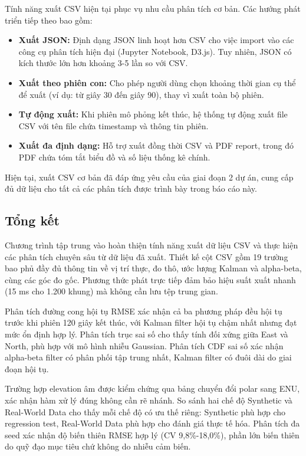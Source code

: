 \hspace{0.5cm} Tính năng xuất CSV hiện tại phục vụ nhu cầu phân tích cơ bản. Các hướng phát triển tiếp theo bao gồm:

\begin{itemize}
\item \textbf{Xuất JSON:} Định dạng JSON linh hoạt hơn CSV cho việc import vào các công cụ phân tích hiện đại (Jupyter Notebook, D3.js). Tuy nhiên, JSON có kích thước lớn hơn khoảng 3-5 lần so với CSV.
\item \textbf{Xuất theo phiên con:} Cho phép người dùng chọn khoảng thời gian cụ thể để xuất (ví dụ: từ giây 30 đến giây 90), thay vì xuất toàn bộ phiên.
\item \textbf{Tự động xuất:} Khi phiên mô phỏng kết thúc, hệ thống tự động xuất file CSV với tên file chứa timestamp và thông tin phiên.
\item \textbf{Xuất đa định dạng:} Hỗ trợ xuất đồng thời CSV và PDF report, trong đó PDF chứa tóm tắt biểu đồ và số liệu thống kê chính.
\end{itemize}

Hiện tại, xuất CSV cơ bản đã đáp ứng yêu cầu của giai đoạn 2 dự án, cung cấp đủ dữ liệu cho tất cả các phân tích được trình bày trong báo cáo này.

\subsection{Tổng kết}

\hspace{0.5cm} Chương trình tập trung vào hoàn thiện tính năng xuất dữ liệu CSV và thực hiện các phân tích chuyên sâu từ dữ liệu đã xuất. Thiết kế cột CSV gồm 19 trường bao phủ đầy đủ thông tin về vị trí thực, đo thô, ước lượng Kalman và alpha-beta, cùng các góc đo gốc. Phương thức phát trực tiếp đảm bảo hiệu suất xuất nhanh (15 ms cho 1.200 khung) mà không cần lưu tệp trung gian.

Phân tích đường cong hội tụ RMSE xác nhận cả ba phương pháp đều hội tụ trước khi phiên 120 giây kết thúc, với Kalman filter hội tụ chậm nhất nhưng đạt mức ổn định hợp lý. Phân tích trục sai số cho thấy tính đối xứng giữa East và North, phù hợp với mô hình nhiễu Gaussian. Phân tích CDF sai số xác nhận alpha-beta filter có phân phối tập trung nhất, Kalman filter có đuôi dài do giai đoạn hội tụ.

Trường hợp elevation âm được kiểm chứng qua bảng chuyển đổi polar sang ENU, xác nhận hàm xử lý đúng không cần rẽ nhánh. So sánh hai chế độ Synthetic và Real-World Data cho thấy mỗi chế độ có ưu thế riêng: Synthetic phù hợp cho regression test, Real-World Data phù hợp cho đánh giá thực tế hóa. Phân tích đa seed xác nhận độ biến thiên RMSE hợp lý (CV 9,8\%-18,0\%), phần lớn biến thiên do quỹ đạo mục tiêu chứ không do nhiễu cảm biến.
